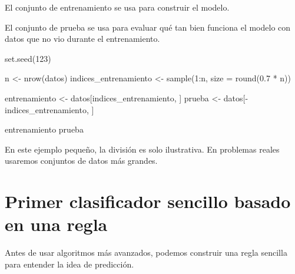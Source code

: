 \documentclass[
  11pt,
  letterpaper,
]{book}
\newenvironment{Shaded}{\begin{snugshade}}{\end{snugshade}}
\newcommand{\AttributeTok}[1]{\textcolor[rgb]{0.40,0.45,0.13}{#1}}
\newcommand{\DecValTok}[1]{\textcolor[rgb]{0.68,0.00,0.00}{#1}}
\newcommand{\FloatTok}[1]{\textcolor[rgb]{0.68,0.00,0.00}{#1}}
\newcommand{\FunctionTok}[1]{\textcolor[rgb]{0.28,0.35,0.67}{#1}}
\newcommand{\NormalTok}[1]{\textcolor[rgb]{0.00,0.23,0.31}{#1}}
\newcommand{\OtherTok}[1]{\textcolor[rgb]{0.00,0.23,0.31}{#1}}
\newcommand{\SpecialCharTok}[1]{\textcolor[rgb]{0.37,0.37,0.37}{#1}}
\newcommand{\StringTok}[1]{\textcolor[rgb]{0.13,0.47,0.30}{#1}}
\begin{document}
El conjunto de entrenamiento se usa para construir el modelo.

El conjunto de prueba se usa para evaluar qué tan bien funciona el
modelo con datos que no vio durante el entrenamiento.

\begin{Shaded}
\begin{Highlighting}[]
\FunctionTok{set.seed}\NormalTok{(}\DecValTok{123}\NormalTok{)}

\NormalTok{n }\OtherTok{\textless{}{-}} \FunctionTok{nrow}\NormalTok{(datos)}
\NormalTok{indices\_entrenamiento }\OtherTok{\textless{}{-}} \FunctionTok{sample}\NormalTok{(}\DecValTok{1}\SpecialCharTok{:}\NormalTok{n, }\AttributeTok{size =} \FunctionTok{round}\NormalTok{(}\FloatTok{0.7} \SpecialCharTok{*}\NormalTok{ n))}

\NormalTok{entrenamiento }\OtherTok{\textless{}{-}}\NormalTok{ datos[indices\_entrenamiento, ]}
\NormalTok{prueba }\OtherTok{\textless{}{-}}\NormalTok{ datos[}\SpecialCharTok{{-}}\NormalTok{indices\_entrenamiento, ]}

\NormalTok{entrenamiento}
\NormalTok{prueba}
\end{Highlighting}
\end{Shaded}

En este ejemplo pequeño, la división es solo ilustrativa. En problemas
reales usaremos conjuntos de datos más grandes.

\section{Primer clasificador sencillo basado en una
regla}\label{primer-clasificador-sencillo-basado-en-una-regla}

Antes de usar algoritmos más avanzados, podemos construir una regla
sencilla para entender la idea de predicción.

\begin{Shaded}
\end{Shaded}
\end{document}
